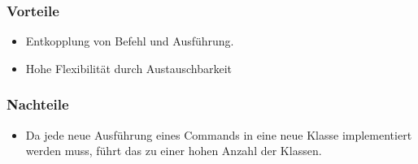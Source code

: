 \subsubsection{Vorteile}
\begin{itemize}
\item Entkopplung von Befehl und
Ausführung.
\item Hohe Flexibilität durch
Austauschbarkeit
\end{itemize}

\subsubsection{Nachteile}
\begin{itemize}
\item Da jede neue Ausführung eines Commands in eine neue Klasse implementiert werden muss, führt das zu einer hohen Anzahl der Klassen.
\end{itemize}
